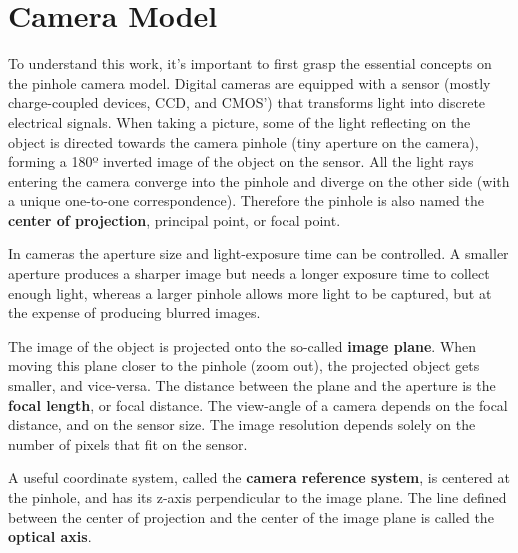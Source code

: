
\section{Camera Model}
\label{cha2:cameramodel}

To understand this work, it's important to first grasp the essential concepts on the pinhole camera model. Digital cameras are equipped with a sensor (mostly charge-coupled devices, CCD, and CMOS') that transforms light into discrete electrical signals. When taking a picture, some of the light reflecting on the object is directed towards the camera pinhole (tiny aperture on the camera), forming a 180º inverted image of the object on the sensor. All the light rays entering the camera converge into the pinhole and diverge on the other side (with a unique one-to-one correspondence). Therefore the pinhole is also named the \textbf{center of projection}, principal point, or focal point.

In cameras the aperture size and light-exposure time can be controlled. A smaller aperture produces a sharper image but needs a longer exposure time to collect enough light, whereas a larger pinhole allows more light to be captured, but at the expense of producing blurred images.

The image of the object is projected onto the so-called \textbf{image plane}. When moving this plane closer to the pinhole (zoom out), the projected object gets smaller, and vice-versa. The distance between the plane and the aperture is the \textbf{focal length}, or focal distance. The view-angle of a camera depends on the focal distance, and on the sensor size. The image resolution depends solely on the number of pixels that fit on the sensor.

A useful coordinate system, called the \textbf{camera reference system}, is centered at the pinhole, and has its z-axis perpendicular to the image plane. The line defined between the center of projection and the center of the image plane is called the \textbf{optical axis}.

